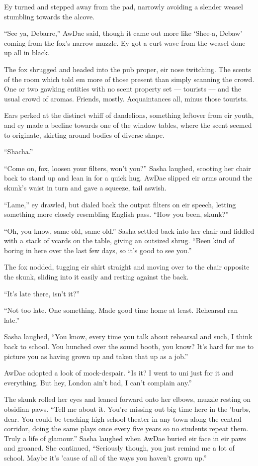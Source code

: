 Ey turned and stepped away from the pad, narrowly avoiding a slender weasel stumbling towards the alcove.

``See ya, Debarre,'' AwDae said, though it came out more like `Shee-a, Debaw' coming from the fox's narrow muzzle. Ey got a curt wave from the weasel done up all in black.

The fox shrugged and headed into the pub proper, eir nose twitching. The scents of the room which told em more of those present than simply scanning the crowd. One or two gawking entities with no scent property set --- tourists --- and the usual crowd of aromas. Friends, mostly. Acquaintances all, minus those tourists.

Ears perked at the distinct whiff of dandelions, something leftover from eir youth, and ey made a beeline towards one of the window tables, where the scent seemed to originate, skirting around bodies of diverse shape.

``Shacha.''

``Come on, fox, loosen your filters, won't you?'' Sasha laughed, scooting her chair back to stand up and lean in for a quick hug. AwDae slipped eir arms around the skunk's waist in turn and gave a squeeze, tail aswish.

``Lame,'' ey drawled, but dialed back the output filters on eir speech, letting something more closely resembling English pass. ``How you been, skunk?''

``Oh, you know, same old, same old.'' Sasha settled back into her chair and fiddled with a stack of vcards on the table, giving an outsized shrug. ``Been kind of boring in here over the last few days, so it's good to see you.''

The fox nodded, tugging eir shirt straight and moving over to the chair opposite the skunk, sliding into it easily and resting against the back.

``It's late there, isn't it?''

``Not too late. One something. Made good time home at least. Rehearsal ran late.''

Sasha laughed, ``You know, every time you talk about rehearsal and such, I think back to school. You hunched over the sound booth, you know? It's hard for me to picture you as having grown up and taken that up as a job.''

AwDae adopted a look of mock-despair. ``Is it? I went to uni just for it and everything. But hey, London ain't bad, I can't complain any.''

The skunk rolled her eyes and leaned forward onto her elbows, muzzle resting on obsidian paws. ``Tell me about it. You're missing out big time here in the 'burbs, dear. You could be teaching high school theater in any town along the central corridor, doing the same plays once every five years so no students repeat them. Truly a life of glamour.'' Sasha laughed when AwDae buried eir face in eir paws and groaned. She continued, ``Seriously though, you just remind me a lot of school. Maybe it's 'cause of all of the ways you haven't grown up.''

